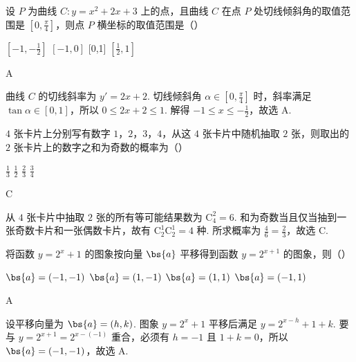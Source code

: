 \begin{problem}
设 \(P\) 为曲线 \(C: y = x^2 + 2x + 3\) 上的点，且曲线 \(C\) 在点 \(P\) 处切线倾斜角的取值范围是 \(\left[0, \frac{\pi}{4}\right]\)，则点 \(P\) 横坐标的取值范围是（\quad）

\choices
    {\(\left[-1, -\frac{1}{2}\right]\)}
    {\([-1,0]\)}
    {[0,1]}
    {\(\left[\frac{1}{2}, 1\right]\)}
\end{problem}

\begin{answer}
A
\end{answer}

\begin{solution}
曲线 \(C\) 的切线斜率为 \(y'=2x+2\). 切线倾斜角 \(\alpha\in[0,\frac{\pi}{4}]\) 时，斜率满足
\(\tan\alpha\in[0,1]\)，所以 \(0\leqslant2x+2\leqslant1\). 解得 \(-1\leqslant x\leqslant-\frac{1}{2}\)，故选 A.
\end{solution}

\begin{problem}
\(4\text{ 张}\)卡片上分别写有数字 \(1\)，\(2\)，\(3\)，\(4\)，从这 \(4\text{ 张}\)卡片中随机抽取 \(2\text{ 张}\)，则取出的 \(2\text{ 张}\)卡片上的数字之和为奇数的概率为（\quad）

\choices
    {\(\frac{1}{3}\)}
    {\( \frac{1}{2} \)}
    {\( \frac{2}{3} \)}
    {\(\frac{3}{4}\)}
\end{problem}

\begin{answer}
C
\end{answer}

\begin{solution}
从 \(4\) 张卡片中抽取 \(2\) 张的所有等可能结果数为 \(\mathrm C_4^2=6\). 和为奇数当且仅当抽到一张奇数卡片和一张偶数卡片，故有 \(\mathrm C_2^1\mathrm C_2^1=4\) 种. 所求概率为
\(\frac{4}{6}=\frac{2}{3}\)，故选 C.
\end{solution}

\begin{problem}
将函数 \( y = 2^{x} + 1 \) 的图象按向量 \( \bs{a} \) 平移得到函数 \( y = 2^{x + 1} \) 的图象，则（\quad）

\choices
    {\(\bs{a} = (-1, - 1)\)}
    {\(\bs{a} = (1, - 1)\)}
    {\(\bs{a} = (1, 1)\)}
    {\(\bs{a} = (-1, 1)\)}
\end{problem}

\begin{answer}
A
\end{answer}

\begin{solution}
设平移向量为 \(\bs{a}=(h,k)\). 图象 \(y=2^x+1\) 平移后满足
\(y=2^{x-h}+1+k\). 要与 \(y=2^{x+1}=2^{x-(-1)}\) 重合，必须有 \(h=-1\) 且 \(1+k=0\)，所以 \(\bs{a}=(-1,-1)\)，故选 A.
\end{solution}

